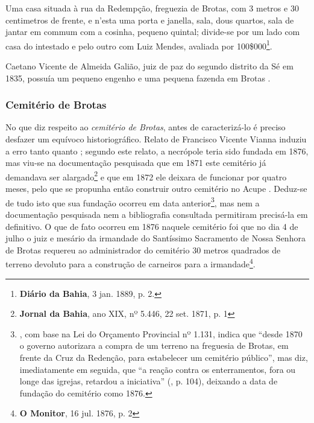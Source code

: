 \begin{citacao}
\begin{citacao}
Uma casa situada à rua da Redempção, freguezia de Brotas, com 3 metros e 30 centimetros de frente, e n'esta uma porta e janella, sala, dous quartos, sala de jantar em commum com a cosinha, pequeno quintal; divide-se por um lado com casa do intestado e pelo outro com Luiz Mendes, avaliada por 100\$000\footnote{\textbf{Diário da Bahia}, 3 jan. 1889, p. 2.}.
\end{citacao}



Caetano Vicente de Almeida Galião, juiz de paz do segundo distrito da Sé em 1835, possuía um pequeno engenho e uma pequena fazenda em Brotas \cite[p.~239]{REIS2004males}.

\subsubsection{Cemitério de Brotas}

No que diz respeito ao \textit{cemitério de Brotas}, antes de caracterizá-lo é preciso desfazer um equívoco historiográfico. Relato de Francisco Vicente Vianna \cite[p.~371]{vianna_bahia_1893} induziu a erro tanto  quanto ; segundo este relato, a necrópole teria sido fundada em 1876, mas viu-se na documentação pesquisada que em 1871 este cemitério já demandava ser alargado\footnote{\textbf{Jornal da Bahia}, ano XIX, nº 5.446, 22 set. 1871, p. 1} e que em 1872 ele deixara de funcionar por quatro meses, pelo que se propunha então construir outro cemitério no Acupe \cite[relatório do chefe de polícia, p.~12]{bahia_1872}. Deduz-se de tudo isto que sua fundação ocorreu em data anterior\footnote{, com base na Lei do Orçamento Provincial nº 1.131, indica que ``desde 1870 o governo autorizara a compra de um terreno na freguesia de Brotas, em frente da Cruz da Redenção, para estabelecer um cemitério público'', mas diz, imediatamente em seguida, que ``a reação contra os enterramentos, fora ou longe das igrejas, retardou a iniciativa'' (\citeyear{flexor_desenho_1999}, p. 104), deixando a data de fundação do cemitério como 1876.}, mas nem a documentação pesquisada nem a bibliografia consultada permitiram precisá-la em definitivo. O que de fato ocorreu em 1876 naquele cemitério foi que no dia 4 de julho o juiz e mesário da irmandade do Santíssimo Sacramento de Nossa Senhora de Brotas requereu ao administrador do cemitério 30 metros quadrados de terreno devoluto para a construção de carneiros para a irmandade\footnote{\textbf{O Monitor}, 16 jul. 1876, p. 2}. 


\end{citacao}
